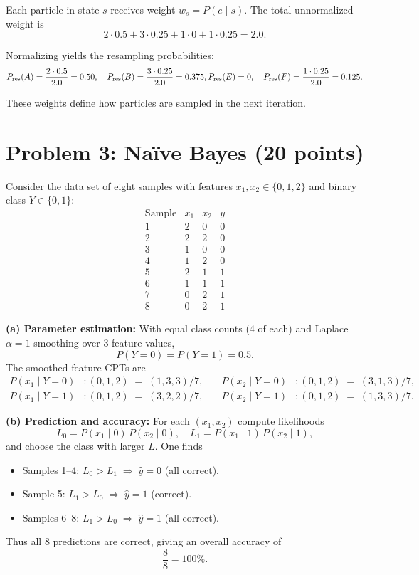 \documentclass[11pt]{article}
\begin{document}
Each particle in state $s$ receives weight $w_s=P(e\mid s)$.  The total unnormalized weight is
\[
  2\cdot0.5 + 3\cdot0.25 + 1\cdot0 + 1\cdot0.25 = 2.0.
\]

Normalizing yields the resampling probabilities:
\[
  P_{\mathrm{res}}(A)=\frac{2\cdot0.5}{2.0}=0.50,\quad
  P_{\mathrm{res}}(B)=\frac{3\cdot0.25}{2.0}=0.375,\\
  P_{\mathrm{res}}(E)=0,\quad
  P_{\mathrm{res}}(F)=\frac{1\cdot0.25}{2.0}=0.125.
\]

These weights define how particles are sampled in the next iteration.

\bigskip
\section*{Problem 3: Naïve Bayes (20 points)}

Consider the data set of eight samples with features $x_1,x_2\in\{0,1,2\}$ and binary class $Y\in\{0,1\}$:
\[
\begin{array}{c|ccc}
\text{Sample} & x_1 & x_2 & y\\\hline
1 & 2 & 0 & 0\\
2 & 2 & 2 & 0\\
3 & 1 & 0 & 0\\
4 & 1 & 2 & 0\\
5 & 2 & 1 & 1\\
6 & 1 & 1 & 1\\
7 & 0 & 2 & 1\\
8 & 0 & 2 & 1
\end{array}
\]

\noindent\textbf{(a) Parameter estimation:}  
With equal class counts (4 of each) and Laplace $\alpha=1$ smoothing over 3 feature values,
\[
P(Y=0)=P(Y=1)=0.5.
\]
The smoothed feature‐CPTs are
\[
\begin{aligned}
P(x_1\mid Y=0)&:(0,1,2)\;=\;(1,3,3)/7, 
&\quad P(x_2\mid Y=0)&:(0,1,2)\;=\;(3,1,3)/7,\\
P(x_1\mid Y=1)&:(0,1,2)\;=\;(3,2,2)/7,
&\quad P(x_2\mid Y=1)&:(0,1,2)\;=\;(1,3,3)/7.
\end{aligned}
\]

\noindent\textbf{(b) Prediction and accuracy:}  
For each $(x_1,x_2)$ compute likelihoods
\[
L_0=P(x_1\mid0)\,P(x_2\mid0),
\quad
L_1=P(x_1\mid1)\,P(x_2\mid1),
\]
and choose the class with larger $L$.  One finds
\begin{itemize}[nosep]
  \item Samples 1–4: $L_0>L_1\;\Rightarrow\;\hat y=0$ (all correct).  
  \item Sample 5:   $L_1>L_0\;\Rightarrow\;\hat y=1$ (correct).  
  \item Samples 6–8: $L_1>L_0\;\Rightarrow\;\hat y=1$ (all correct).  
\end{itemize}
Thus all 8 predictions are correct, giving an overall accuracy of  
\[
\frac{8}{8}=100\%.\]
\end{document}
